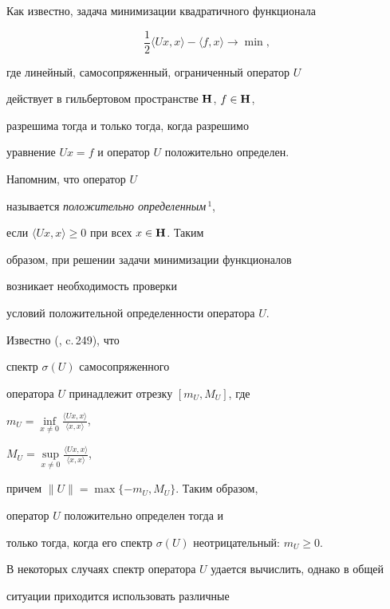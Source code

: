 

\maketitle


\label{begin}








Как известно, задача минимизации квадратичного функционала


$$


\frac12\langle Ux,x\rangle-\langle f,x\rangle\rightarrow\min,


$$


где линейный, самосопряженный, ограниченный оператор $U$ 


действует в гильбертовом пространстве ${\bold H}$, $f\in{\bold H}$,


разрешима тогда и только тогда, когда разрешимо


уравнение $Ux=f$ и оператор $U$ положительно определен. 


Напомним, что оператор $U$


называется {\it положительно определенным}\,$^1$,


если $\langle Ux,x\rangle\ge0$ при всех $x\in{\bold H}$. Таким


образом, при решении задачи минимизации функционалов 


возникает необходимость проверки


условий положительной определенности оператора $U$. 


Известно (\cite{LS}, c.\,249), что


спектр $\sigma(U)$ самосопряженного 


оператора $U$ принадлежит отрезку $[m_U,M_U]$, где


$m_U=\inf\limits_{x\neq0}\frac{\langle Ux,x\rangle}{\langle x,x\rangle}$,


$M_U=\sup\limits_{x\neq0}\frac{\langle Ux,x\rangle}{\langle x,x\rangle}$,


причем $\|U\|=\max\{-m_U,M_U\}$. Таким образом, 


оператор $U$ положительно определен тогда и


только тогда, когда его спектр $\sigma(U)$ неотрицательный: $m_U\ge0$.


В некоторых случаях спектр оператора $U$ удается вычислить, однако в общей


ситуации приходится использовать различные 


